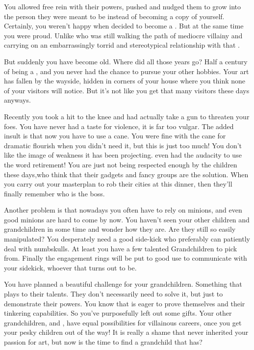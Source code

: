 \documentclass[char]{LRSguildcamp1}
\begin{document}
You allowed \cYoungest{} free rein with their powers, pushed and nudged them to grow into the person they were meant to be instead of becoming a copy of yourself. Certainly, you weren't happy when \cYoungest{} decided to become a \cYoungest{\hero}. But at the same time you were proud. Unlike \cOldest{} who was still walking the path of mediocre villainy and carrying on an embarrassingly torrid and stereotypical relationship with that \cOS{\hero}. 

But suddenly you have become old. Where did all those years go? Half a century of being a \cGrandma{\villain}, and you never had the chance to pursue your other hobbies. Your art has fallen by the wayside, hidden in corners of your house where you think none of your visitors will notice. But it's not like you get that many visitors these days anyways.

Recently you took a hit to the knee and had actually take a gun to threaten your foes. You have never had a taste for violence, it is far too vulgar. The added insult is that now you have to use a cane. You were fine with the cane for dramatic flourish when you didn't need it, but this is just too much! You don't like the image of weakness it has been projecting. \cOldest{} even had the audacity to use the word retirement! You are just not being respected enough by the children these days,who think that their gadgets and fancy groups are the solution. When you carry out your masterplan to rob their cities at this dinner, then they'll finally remember who is the boss. 

Another problem is that nowadays you often have to rely on minions, and even good minions are hard to come by now. You haven't seen your other children and grandchildren in some time and wonder how they are. Are they still so easily manipulated? You desperately need a good side-kick who preferably can patiently deal with numbskulls.  At least you have a few talented Grandchildren to pick from. Finally the engagement rings will be put to good use to communicate with your sidekick, whoever that turns out to be. 

You have planned a beautiful challenge for your grandchildren. Something that plays to their talents. They don't necessarily need to solve it, but just to demonstrate their powers. You know that \cTeen{} is eager to prove themselves and their tinkering capabilities. So you've purposefully left out some gifts. Your other grandchildren, \cGrad{} and \cTween{}, have equal possibilities for villainous careers, once you get your pesky children out of the way! It is really a shame that \cYoungest {} never inherited your passion for art, but now is the time to find a grandchild that has? 
\end{document}

